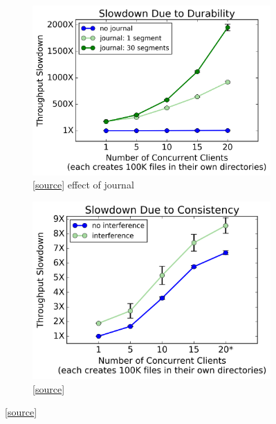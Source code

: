 \begin{figure}[t]
  \centering
  \begin{subfigure}[b]{.32\linewidth}
      \centering
      \includegraphics[width=1\linewidth]{./chapters/cudele/figures/slowdown-journal.png}
      \caption{[\href{https://github.com/michaelsevilla/cudele-popper/blob/master/experiments/baseline-durability/visualize/viz.ipynb}{source}]
      effect of journal} \label{fig:overhead-a}
  \end{subfigure}
  \begin{subfigure}[b]{.32\linewidth}
      \centering
      \includegraphics[width=0.98\linewidth]{./chapters/cudele/figures/slowdown-interfere-scale.png}
      \caption{[\href{https://github.com/michaelsevilla/cudele-popper/blob/master/experiments/baseline-creates/visualize/viz.ipynb}{source}]
}
\end{subfigure}
\end{figure}
